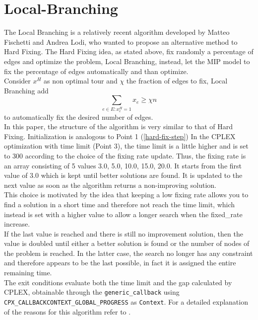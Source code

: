 \section{Local-Branching}
The Local Branching is a relatively recent algorithm developed by Matteo Fischetti and Andrea Lodi, who wanted to propose an alternative method to Hard Fixing. The Hard Fixing idea, as stated above, fix randomly a percentage of edges and optimize the problem, Local Branching, instead, let the MIP model to fix the percentage of edges automatically and than optimize. \\
Consider $ x^H $ as non optimal tour and $ \chi $ the fraction of edges to fix, Local Branching add
\begin{equation}
 \sum_{ e\in E: x_e^H = 1 } x_e \ge \chi n
\end{equation}
to automatically fix the desired number of edges. \\
In this paper, the structure of the algorithm is very similar to that of Hard Fixing. Initialization is analogous to Point 1 (\ref{hard-fix-step})
In the CPLEX optimization with time limit (Point 3), the time limit is a little higher and is set to 300 according to the choice of the fixing rate update. Thus, the fixing rate is an array consisting of 5 values {3.0, 5.0, 10.0, 15.0, 20.0}. It starts from the first value of 3.0 which is kept until better solutions are found. It is updated to the next value as soon as the algorithm returns a non-improving solution.  \\
This choice is motivated by the idea that keeping a low fixing rate allows you to find a solution in a short time and therefore not reach the time limit, which instead is set with a higher value to allow a longer search when the fixed\_rate increase. \\
If the last value is reached and there is still no improvement solution, then the value is doubled until either a better solution is found or the number of nodes of the problem is reached. In the latter case, the search no longer has any constraint and therefore appears to be the last possible, in fact it is assigned the entire remaining time. \\
The exit conditions evaluate both the time limit and the gap calculated by CPLEX, obtainable through the \texttt{generic\_callback} using \texttt{CPX\_CALLBACKCONTEXT\_GLOBAL\_PROGRESS} as \texttt{Context}. 
For a detailed explanation of the reasons for this algorithm refer to \cite{article}.


